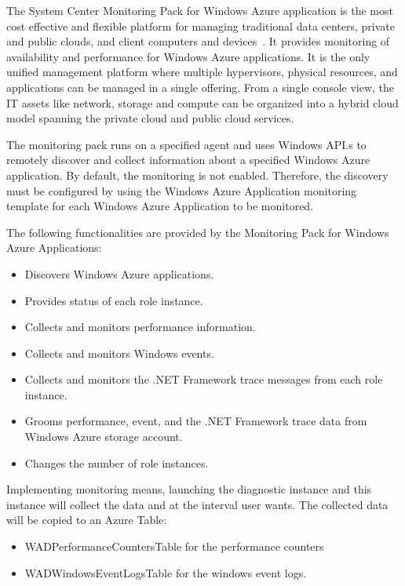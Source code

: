 \documentclass{sig-alternate-05-2015}
\begin{document}
The System Center Monitoring Pack for Windows Azure application is the most cost effective and flexible platform for managing traditional data centers, private and public clouds, and client computers and devices~\cite{MonitoringPackAzure11}. It provides monitoring of availability and performance for Windows Azure applications. It is the only unified management platform where multiple hypervisors, physical resources, and applications can be managed in a single offering. From a single console view, the IT assets like network, storage and compute can be organized into a hybrid cloud model spanning the private cloud and public cloud services.

The monitoring pack runs on a specified agent and uses Windows API.s to remotely discover and collect information about a specified Windows Azure application. By default, the monitoring is not enabled. Therefore, the discovery must be configured by using the Windows Azure Application monitoring template for each Windows Azure Application to be monitored.

The following functionalities are provided by the Monitoring Pack for Windows Azure Applications:

\begin{itemize}
 \item Discovers Windows Azure applications.
 \item Provides status of each role instance.
 \item Collects and monitors performance information.
 \item Collects and monitors Windows events.
 \item Collects and monitors the .NET Framework trace messages from each role instance.
 \item Grooms performance, event, and the .NET Framework trace data from Windows Azure storage account.
 \item Changes the number of role instances.
\end{itemize}

Implementing monitoring means, launching the diagnostic instance and this instance will collect the data and at the interval user wants. The collected data will be copied to an Azure Table:

\begin{itemize}
\item WADPerformanceCountersTable for the performance counters
\item WADWindowsEventLogsTable for the windows event logs.
\end{itemize}
\end{document}

